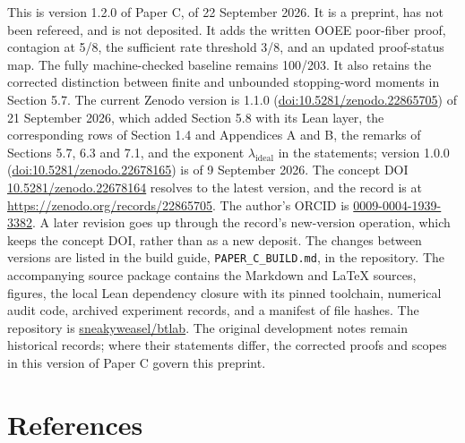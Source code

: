 \documentclass[11pt,a4paper]{article}
\begin{document}
This is version 1.2.0 of Paper C, of 22 September 2026. It is a
preprint, has not been refereed, and is not deposited. It adds the
written OOEE poor-fiber proof, contagion at 5/8, the sufficient rate
threshold 3/8, and an updated proof-status map. The fully
machine-checked baseline remains 100/203. It also retains the corrected
distinction between finite and unbounded stopping-word moments in
Section 5.7. The current Zenodo version is 1.1.0
(\href{https://doi.org/10.5281/zenodo.22865705}{doi:10.5281/zenodo.22865705})
of 21 September 2026, which added Section 5.8 with its Lean layer, the
corresponding rows of Section 1.4 and Appendices A and B, the remarks of
Sections 5.7, 6.3 and 7.1, and the exponent \(\lambda_{\mathrm{ideal}}\)
in the statements; version 1.0.0
(\href{https://doi.org/10.5281/zenodo.22678165}{doi:10.5281/zenodo.22678165})
is of 9 September 2026. The concept DOI
\href{https://doi.org/10.5281/zenodo.22678164}{10.5281/zenodo.22678164}
resolves to the latest version, and the record is at
\url{https://zenodo.org/records/22865705}. The author's ORCID is
\href{https://orcid.org/0009-0004-1939-3382}{0009-0004-1939-3382}. A
later revision goes up through the record's new-version operation, which
keeps the concept DOI, rather than as a new deposit. The changes between
versions are listed in the build guide,
\texttt{\nolinkurl{PAPER_C_BUILD.md}}, in the repository. The
accompanying source package contains the Markdown and LaTeX sources,
figures, the local Lean dependency closure with its pinned toolchain,
numerical audit code, archived experiment records, and a manifest of
file hashes. The repository is
\href{https://github.com/sneakyweasel/btlab}{sneakyweasel/btlab}. The
original development notes remain historical records; where their
statements differ, the corrected proofs and scopes in this version of
Paper C govern this preprint.

\section{References}\label{references}

\begingroup\small
\end{document}
